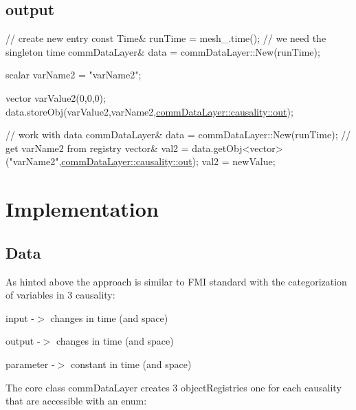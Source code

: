 \subsection*{output}


\begin{DoxyCode}
\textcolor{comment}{// create new entry}
\textcolor{keyword}{const} Time& runTime = mesh\_.time(); \textcolor{comment}{// we need the singleton time}
commDataLayer& data = commDataLayer::New(runTime);

scalar varName2 = \textcolor{stringliteral}{"varName2"}; 

vector varValue2(0,0,0); 
data.storeObj(varValue2,varName2,\hyperlink{createOutput_8H_a0467985694a37c29b5874ecb748bf09e}{commDataLayer::causality::out});
\end{DoxyCode}



\begin{DoxyCode}
\textcolor{comment}{// work with data}
commDataLayer& data = commDataLayer::New(runTime);
\textcolor{comment}{// get varName2 from registry}
vector& val2 = data.getObj<vector>(\textcolor{stringliteral}{"varName2"},\hyperlink{createOutput_8H_a0467985694a37c29b5874ecb748bf09e}{commDataLayer::causality::out}); 
val2 = newValue;
\end{DoxyCode}


\section*{Implementation}

\subsection*{Data}

As hinted above the approach is similar to F\+MI standard with the categorization of variables in 3 causality\+:


\begin{DoxyItemize}
\item input -\/$>$ changes in time (and space)
\item output -\/$>$ changes in time (and space)
\item parameter -\/$>$ constant in time (and space)
\end{DoxyItemize}

The core class {\ttfamily comm\+Data\+Layer} creates 3 {\ttfamily object\+Registries} one for each causality that are accessible with an enum\+:


